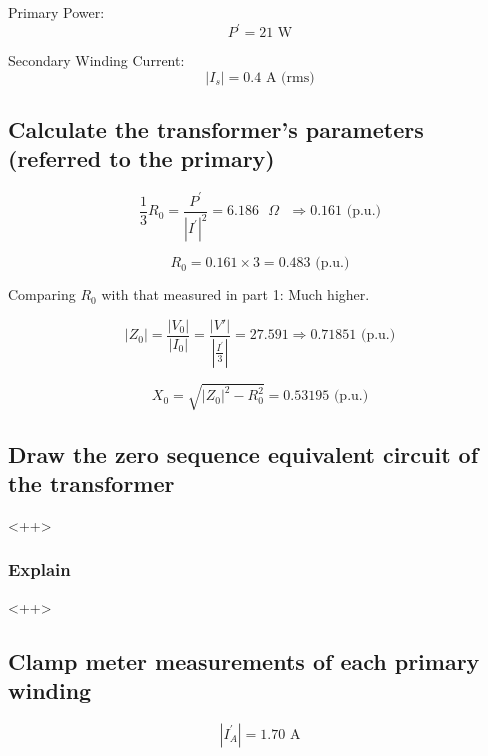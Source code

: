 \documentclass{article}
\begin{document}
Primary Power:
\begin{equation}
  P^{'} = 21 \text{ W}
\end{equation}

Secondary Winding Current:
\begin{equation}
  | I_{s} | = 0.4 \text{ A (rms)}
\end{equation}

\subsection{Calculate the transformer's parameters (referred to the primary)} 

\begin{equation}
  \frac{1}{3} R_0 = \frac{P^{'}}{|I^{'} |^{2}} = 6.186 \text{ $\Omega$ } \Rightarrow 0.161  \text{ (p.u.)}
\end{equation}

\begin{equation}
  R_0  = 0.161 \times 3 = 0.483 \text{ (p.u.)}
\end{equation}

Comparing $R_0$ with that measured in part 1: Much higher. 

\begin{equation}
  | Z_0 | = \frac{| V_0 |}{| I_0 |} = \frac{| V' |}{| \frac{I^{'}}{3}|} = 27.591 \Rightarrow 0.71851 \text{ (p.u.)}
\end{equation}

\begin{equation}
  X_0 = \sqrt{| Z_0 |^{2} - R^{2}_0} = 0.53195 \text{ (p.u.)}
\end{equation}

\subsection{Draw the zero sequence equivalent circuit of the transformer} 
<++>

\subsubsection{Explain} 
<++>

\subsection{Clamp meter measurements of each primary winding} 

\begin{equation}
  | I^{'}_{A} | = 1.70 \text{ A}
\end{equation}
\end{document}
